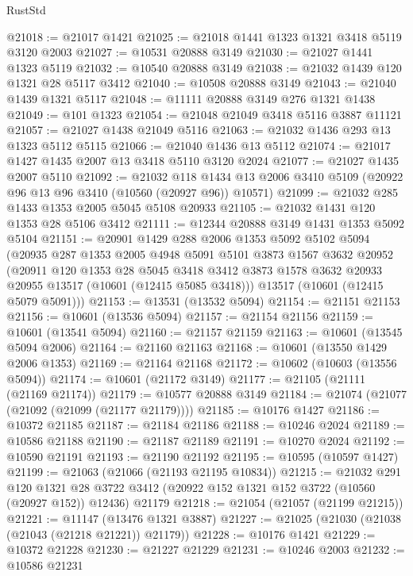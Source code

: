 \begin{lexlean}{RustStd}
\begin{coremodule}
@21018 := @21017 @1421
@21025 := @21018 @1441 @1323 @1321 @3418 @5119 @3120 @2003
@21027 := @10531 @20888 @3149
@21030 := @21027 @1441 @1323 @5119
@21032 := @10540 @20888 @3149
@21038 := @21032 @1439 @120 @1321 @28 @5117 @3412
@21040 := @10508 @20888 @3149
@21043 := @21040 @1439 @1321 @5117
@21048 := @11111 @20888 @3149 @276 @1321 @1438
@21049 := @101 @1323
@21054 := @21048 @21049 @3418 @5116 @3887 @11121
@21057 := @21027 @1438 @21049 @5116
@21063 := @21032 @1436 @293 @13 @1323 @5112 @5115
@21066 := @21040 @1436 @13 @5112
@21074 := @21017 @1427 @1435 @2007 @13 @3418 @5110 @3120 @2024
@21077 := @21027 @1435 @2007 @5110
@21092 := @21032
    @118
    @1434
    @13
    @2006
    @3410
    @5109
    (@20922 @96 @13 @96 @3410 (@10560 (@20927 @96)) @10571)
@21099 := @21032 @285 @1433 @1353 @2005 @5045 @5108 @20933
@21105 := @21032 @1431 @120 @1353 @28 @5106 @3412
@21111 := @12344 @20888 @3149 @1431 @1353 @5092 @5104
@21151 := @20901
    @1429
    @288
    @2006
    @1353
    @5092
    @5102
    @5094
    (@20935
      @287
      @1353
      @2005
      @4948
      @5091
      @5101
      @3873
      @1567
      @3632
      @20952
      (@20911
        @120
        @1353
        @28
        @5045
        @3418
        @3412
        @3873
        @1578
        @3632
        @20933
        @20955
        @13517
        (@10601 (@12415 @5085 @3418)))
      @13517
      (@10601 (@12415 @5079 @5091)))
@21153 := @13531 (@13532 @5094)
@21154 := @21151 @21153
@21156 := @10601 (@13536 @5094)
@21157 := @21154 @21156
@21159 := @10601 (@13541 @5094)
@21160 := @21157 @21159
@21163 := @10601 (@13545 @5094 @2006)
@21164 := @21160 @21163
@21168 := @10601 (@13550 @1429 @2006 @1353)
@21169 := @21164 @21168
@21172 := @10602 (@10603 (@13556 @5094))
@21174 := @10601 (@21172 @3149)
@21177 := @21105 (@21111 (@21169 @21174))
@21179 := @10577 @20888 @3149
@21184 := @21074 (@21077 (@21092 (@21099 (@21177 @21179))))
@21185 := @10176 @1427
@21186 := @10372 @21185
@21187 := @21184 @21186
@21188 := @10246 @2024
@21189 := @10586 @21188
@21190 := @21187 @21189
@21191 := @10270 @2024
@21192 := @10590 @21191
@21193 := @21190 @21192
@21195 := @10595 (@10597 @1427)
@21199 := @21063 (@21066 (@21193 @21195 @10834))
@21215 := @21032
    @291
    @120
    @1321
    @28
    @3722
    @3412
    (@20922 @152 @1321 @152 @3722 (@10560 (@20927 @152)) @12436)
    @21179
@21218 := @21054 (@21057 (@21199 @21215))
@21221 := @11147 (@13476 @1321 @3887)
@21227 := @21025 (@21030 (@21038 (@21043 (@21218 @21221)) @21179))
@21228 := @10176 @1421
@21229 := @10372 @21228
@21230 := @21227 @21229
@21231 := @10246 @2003
@21232 := @10586 @21231

\end{coremodule}
\end{lexlean}
